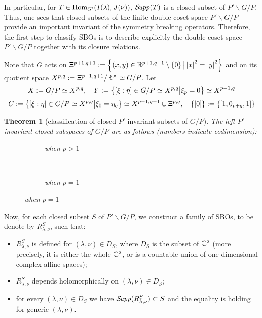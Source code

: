 \documentclass[12pt]{article} %
\newtheorem{theorem}{Theorem}
\newcommand{\Hom}{\mbox{\normalfont Hom}}
\newcommand{\Supp}{\mathcal{S}\!{\it upp}}
\theoremstyle{definition}
\theoremstyle{exampstyle} \newtheorem{examp}[theorem]{Theorem}
\begin{document}
In particular, for $T\in\Hom_{G'}(I(\lambda),J(\nu))$, $\Supp(T)$ is a closed subset of $P'\backslash G/P$.
Thus, one sees that closed subsets of the finite double coset space $P'\backslash G/P$ provide an important invariant of the symmetry breaking operators. Therefore,
the first step to classify SBOs is to describe explicitly the double coset space $P'\backslash G/P$ together with its closure relations.

Note that $G$ acts on $\Xi^{p+1,q+1}:=\left\{(x,y)\in\mathbb{R}^{p+1,q+1}\setminus\left\{ 0 \right\}\big| \left|x\right|^2=\left|y\right|^2\right\}$ and on its quotient space
$X^{p,q}:=\Xi^{p+1,q+1}/\mathbb{R}^{\times}\simeq G/P$. Let
\[
	X:=G/P\simeq X^{p,q},\quad Y:=\left\{[\xi:\eta]\in G/P\simeq X^{p,q}\big| \xi_{p}=0\right\}\simeq X^{p-1,q}\]
	\[C:=\left\{[\xi:\eta]\in G/P\simeq X^{p,q}\big| \xi_{0}=\eta_q\right\}\simeq X^{p-1,q-1}\cup\Xi^{p,q},\quad\left\{ [0] \right\}:=\left\{ [1,0_{p+q},1] \right\}\]
\begin{theorem}[classification of closed $P'$-invariant subsets of $G/P$]
	The left $P'$-invariant closed subspaces of $G/P$ are as follows (numbers indicate codimension):\\
  \begin{figure}[H]
    \centering
    \begin{subfigure}[t]{0.3\textwidth}
	    \xymatrixrowsep{0.5pc}
	\caption{when $p>1$}
    \end{subfigure}
    ~ %
    \begin{subfigure}[t]{0.3\textwidth}
	    \xymatrixrowsep{0.5pc}
	    {}
	\caption{when $p=1$}
    \end{subfigure}
\end{figure}
\end{theorem}
Now, for each closed subset $S$ of $P'\backslash G/P$, we construct a family of SBOs, to be denote by $R^S_{\lambda,\nu}$, such that:
\begin{itemize}
	\item $R_{\lambda,\nu}^S$ is defined for $(\lambda,\nu)\in D_S$, where $D_S$ is the subset of $\mathbb{C}^2$ (more precisely, it is either the whole $\mathbb{C}^2$, or is a countable
		union of one-dimensional complex affine spaces);
	\item $R_{\lambda,\nu}^S$ depends holomorphically on $(\lambda,\nu)\in D_S$;
	\item for every $(\lambda,\nu)\in D_S$ we have $\Supp(R_{\lambda,\nu}^S)\subset S$ and the equality is holding for generic $(\lambda,\nu)$.
\end{itemize}
\end{document}
